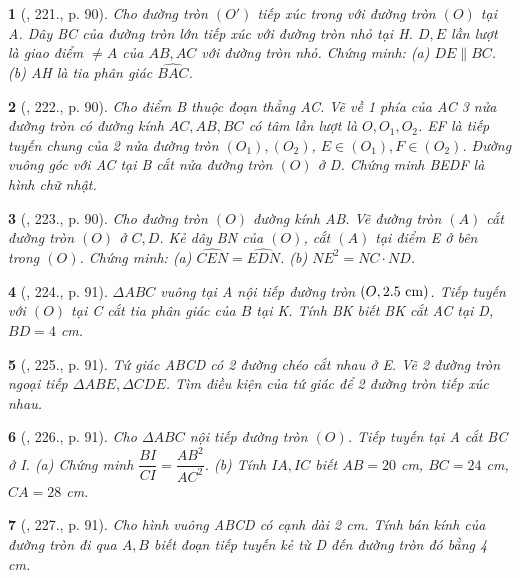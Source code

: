 \documentclass{article}
\newtheorem{baitoan}{}
\begin{document}
\begin{baitoan}[\cite{Binh_Toan_9_tap_2}, 221., p. 90]
	Cho đường tròn $(O')$ tiếp xúc trong với đường tròn $(O)$ tại A. Dây BC của đường tròn lớn tiếp xúc với đường tròn nhỏ tại H. $D,E$ lần lượt là giao điểm $\ne A$ của $AB,AC$ với đường tròn nhỏ. Chứng minh: (a) $DE\parallel BC$. (b) AH là tia phân giác $\widehat{BAC}$.
\end{baitoan}

\begin{baitoan}[\cite{Binh_Toan_9_tap_2}, 222., p. 90]
	Cho điểm B thuộc đoạn thẳng AC. Vẽ về 1 phía của AC 3 nửa đường tròn có đường kính $AC,AB,BC$ có tâm lần lượt là $O,O_1,O_2$. EF là tiếp tuyến chung của 2 nửa đường tròn $(O_1),(O_2)$, $E\in(O_1),F\in(O_2)$. Đường vuông góc với AC tại B cắt nửa đường tròn $(O)$ ở D. Chứng minh BEDF là hình chữ nhật.
\end{baitoan}

\begin{baitoan}[\cite{Binh_Toan_9_tap_2}, 223., p. 90]
	Cho đường tròn $(O)$ đường kính AB. Vẽ đường tròn $(A)$ cắt đường tròn $(O)$ ở $C,D$. Kẻ dây BN của $(O)$, cắt $(A)$ tại điểm E ở bên trong $(O)$. Chứng minh: (a) $\widehat{CEN} = \widehat{EDN}$. (b) $NE^2 = NC\cdot ND$.
\end{baitoan}

\begin{baitoan}[\cite{Binh_Toan_9_tap_2}, 224., p. 91]
	$\Delta ABC$ vuông tại A nội tiếp đường tròn $(O,2.5\ {\rm cm})$. Tiếp tuyến với $(O)$ tại C cắt tia phân giác của $\widehat{B}$ tại K. Tính BK biết BK cắt AC tại D, $BD = 4$ {\rm cm}.
\end{baitoan}

\begin{baitoan}[\cite{Binh_Toan_9_tap_2}, 225., p. 91]
	Tứ giác ABCD có 2 đường chéo cắt nhau ở E. Vẽ 2 đường tròn ngoại tiếp $\Delta ABE,\Delta CDE$. Tìm điều kiện của tứ giác để 2 đường tròn tiếp xúc nhau.
\end{baitoan}

\begin{baitoan}[\cite{Binh_Toan_9_tap_2}, 226., p. 91]
	Cho $\Delta ABC$ nội tiếp đường tròn $(O)$. Tiếp tuyến tại A cắt BC ở I. (a) Chứng minh $\dfrac{BI}{CI} = \dfrac{AB^2}{AC^2}$. (b) Tính $IA,IC$ biết $AB = 20$ {\rm cm}, $BC = 24$ {\rm cm}, $CA = 28$ {\rm cm}.
\end{baitoan}

\begin{baitoan}[\cite{Binh_Toan_9_tap_2}, 227., p. 91]
	Cho hình vuông ABCD có cạnh dài {\rm2 cm}. Tính bán kính của đường tròn đi qua $A,B$ biết đoạn tiếp tuyến kẻ từ D đến đường tròn đó bằng {\rm4 cm}.
\end{baitoan}
\end{document}

